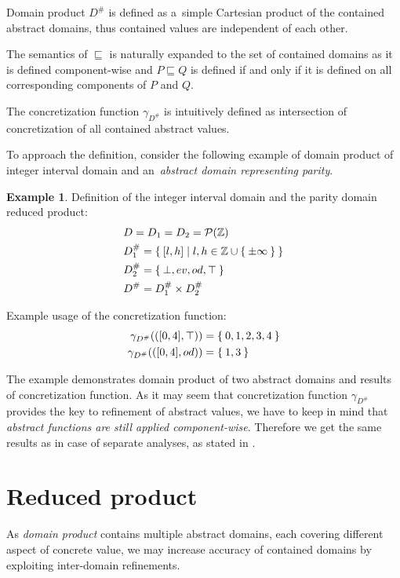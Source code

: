 \documentclass[12pt,oneside]{fithesis2}
\theoremstyle{definition}
\newtheorem{exmp}{Example}[section]
\begin{document}
Domain product $D^\#$ is defined as a~simple Cartesian product of the contained abstract domains, thus contained values are independent of each other.

The semantics of $\sqsubseteq$ is naturally expanded to the set of contained domains as it is defined component-wise and $P \sqsubseteq Q$ is defined if and only if it is defined on all corresponding components of $P$ and $Q$.

The concretization function $\gamma_{D^\#}$ is intuitively defined as intersection of concretization of all contained abstract values.

To approach the definition, consider the following example of domain product of integer interval domain and an~\textit{abstract domain representing parity}.

\begin{exmp}\label{exmp:domain-product}
  Definition of the integer interval domain and the parity domain reduced product:
  \begin{align*}
    &D = D_1 = D_2 = \mathcal P(\mathbb Z)\\
    &D^\#_1 = \Set{[l,h] | l,h \in \mathbb{Z} \cup \Set{\pm\infty}}\\
    &D^\#_2 = \Set{\bot, ev, od, \top}\\
    &D^\# = D^\#_1 \times D^\#_2
  \end{align*}

  Example usage of the concretization function:
  \begin{align*}
    \gamma_{D^\#}(\left( [0, 4], \top \right)) &= \Set{0,1,2,3,4}\\
    \gamma_{D^\#}(\left( [0, 4], od \right)) &= \Set{1,3}
  \end{align*}
\end{exmp}

The example demonstrates domain product of two abstract domains and results of concretization function. As it may seem that concretization function $\gamma_{D^\#}$ provides the key to refinement of abstract values, we have to keep in mind that \textit{abstract functions are still applied component-wise}. Therefore we get the same results as in case of separate analyses, as stated in \cite{CousotCousot79-1}.

\section{Reduced product}\label{sec:reduced-cardinality-product}

As \textit{domain product} contains multiple abstract domains, each covering different aspect of concrete value, we may increase accuracy of contained domains by exploiting inter-domain refinements.
\end{document}
